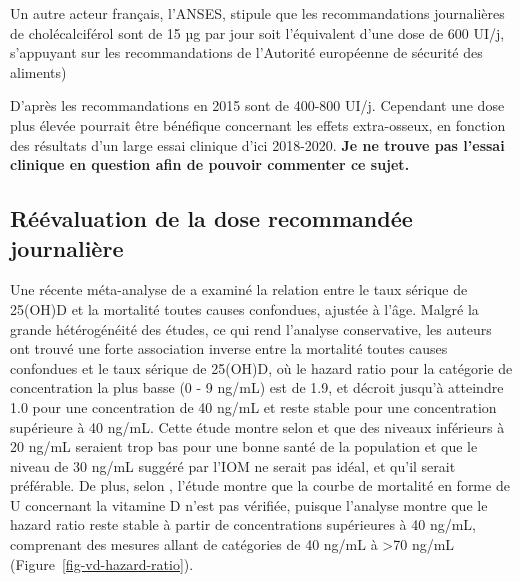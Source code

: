 \documentclass[
  a4paper,
  DIV=11,
  numbers=noendperiod,
  listof=totoc]{scrreprt}
\begin{document}
Un autre acteur français, l'ANSES, stipule que les recommandations
journalières de cholécalciférol sont de 15 µg par jour soit l'équivalent
d'une dose de 600 UI/j, s'appuyant sur les recommandations de l'Autorité
européenne de sécurité des aliments) \autocite{ANSES.2022}

D'après \textcite{Carmeliet.2015} les recommandations en 2015 sont de
400-800 UI/j. Cependant une dose plus élevée pourrait être bénéfique
concernant les effets extra-osseux, en fonction des résultats d'un large
essai clinique d'ici 2018-2020. \textbf{Je ne trouve pas l'essai
clinique en question afin de pouvoir commenter ce sujet.}

\hypertarget{ruxe9uxe9valuation-de-la-dose-recommanduxe9e-journaliuxe8re}{%
\subsection{Réévaluation de la dose recommandée
journalière}\label{ruxe9uxe9valuation-de-la-dose-recommanduxe9e-journaliuxe8re}}

Une récente méta-analyse de \textcite{Garland.2014} a examiné la
relation entre le taux sérique de 25(OH)D et la mortalité toutes causes
confondues, ajustée à l'âge. Malgré la grande hétérogénéité des études,
ce qui rend l'analyse conservative, les auteurs ont trouvé une forte
association inverse entre la mortalité toutes causes confondues et le
taux sérique de 25(OH)D, où le hazard ratio pour la catégorie de
concentration la plus basse (0 - 9 ng/mL) est de 1.9, et décroit jusqu'à
atteindre 1.0 pour une concentration de 40 ng/mL et reste stable pour
une concentration supérieure à 40 ng/mL. Cette étude montre selon
\textcite{Garland.2014} et \textcite{Papadimitriou.2017} que des niveaux
inférieurs à 20 ng/mL seraient trop bas pour une bonne santé de la
population et que le niveau de 30 ng/mL suggéré par l'IOM ne serait pas
idéal, et qu'il serait préférable. De plus, selon
\textcite{Papadimitriou.2017}, l'étude montre que la courbe de mortalité
en forme de U concernant la vitamine D n'est pas vérifiée, puisque
l'analyse montre que le hazard ratio reste stable à partir de
concentrations supérieures à 40 ng/mL, comprenant des mesures allant de
catégories de 40 ng/mL à \textgreater70 ng/mL
(Figure~\ref{fig-vd-hazard-ratio}).
\end{document}
